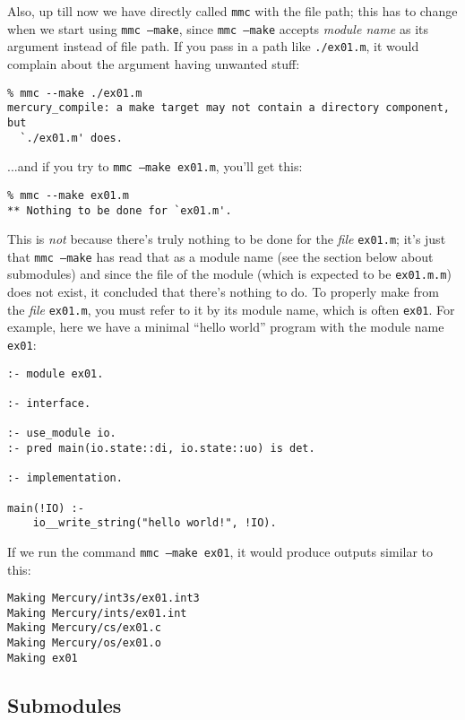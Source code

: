 Also, up till now we have directly called \texttt{mmc} with the file path; this has to change when we start using \texttt{mmc --make}, since \texttt{mmc --make} accepts \textit{module name} as its argument instead of file path. If you pass in a path like \texttt{./ex01.m}, it would complain about the argument having unwanted stuff:

\begin{lstlisting}
% mmc --make ./ex01.m
mercury_compile: a make target may not contain a directory component, but
  `./ex01.m' does.
\end{lstlisting}

...and if you try to \texttt{mmc --make ex01.m}, you'll get this:

\begin{lstlisting}
% mmc --make ex01.m
** Nothing to be done for `ex01.m'.
\end{lstlisting}

This is \textit{not} because there's truly nothing to be done for the \textit{file} \texttt{ex01.m}; it's just that \texttt{mmc --make} has read that as a module name (see the section below about submodules) and since the file of the module (which is expected to be \texttt{ex01.m.m}) does not exist, it concluded that there's nothing to do. To properly make from the \textit{file} \texttt{ex01.m}, you must refer to it by its module name, which is often \texttt{ex01}. For example, here we have a minimal ``hello world'' program with the module name \texttt{ex01}:

\begin{lstlisting}[language=Mercury]
:- module ex01.

:- interface.

:- use_module io.
:- pred main(io.state::di, io.state::uo) is det.

:- implementation.

main(!IO) :-
	io__write_string("hello world!", !IO).
\end{lstlisting}

If we run the command \texttt{mmc --make ex01}, it would produce outputs similar to this:

\begin{lstlisting}
Making Mercury/int3s/ex01.int3
Making Mercury/ints/ex01.int
Making Mercury/cs/ex01.c
Making Mercury/os/ex01.o
Making ex01
\end{lstlisting}




\subsection{Submodules}


